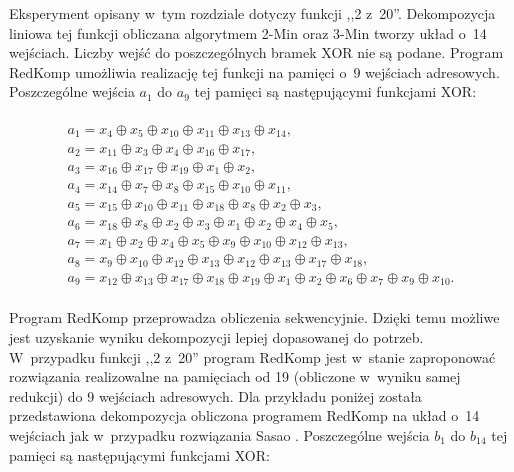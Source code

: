 Eksperyment opisany w~tym rozdziale dotyczy funkcji ,,2 z~20''.
Dekompozycja liniowa tej funkcji obliczana algorytmem 2-Min oraz 3-Min \cite{sasao-s-min} tworzy układ o~14 wejściach.
Liczby wejść do poszczególnych bramek XOR nie są podane.
Program RedKomp umożliwia realizację tej funkcji na pamięci o~9 wejściach adresowych.
Poszczególne wejścia $a_1$ do $a_9$ tej pamięci są następującymi funkcjami XOR:

\begin{multline} \\
a_1 = x_{4} \oplus x_{5} \oplus x_{10} \oplus x_{11} \oplus x_{13} \oplus x_{14}, \\
a_2 = x_{11} \oplus x_{3} \oplus x_{4} \oplus x_{16} \oplus x_{17}, \\
a_3 = x_{16} \oplus x_{17} \oplus x_{19} \oplus x_{1} \oplus x_{2}, \\
a_4 = x_{14} \oplus x_{7} \oplus x_{8} \oplus x_{15} \oplus x_{10} \oplus x_{11}, \\
a_5 = x_{15} \oplus x_{10} \oplus x_{11} \oplus x_{18} \oplus x_{8} \oplus x_{2} \oplus x_{3}, \\
a_6 = x_{18} \oplus x_{8} \oplus x_{2} \oplus x_{3} \oplus x_{1} \oplus x_{2} \oplus x_{4} \oplus x_{5}, \\
a_7 = x_{1} \oplus x_{2} \oplus x_{4} \oplus x_{5} \oplus x_{9} \oplus x_{10} \oplus x_{12} \oplus x_{13}, \\
a_8 = x_{9} \oplus x_{10} \oplus x_{12} \oplus x_{13} \oplus x_{12} \oplus x_{13} \oplus x_{17} \oplus x_{18}, \\
a_9 = x_{12} \oplus x_{13} \oplus x_{17} \oplus x_{18} \oplus x_{19} \oplus x_{1} \oplus x_{2} \oplus x_{6} \oplus x_{7} \oplus x_{9} \oplus x_{10}. \\
\end{multline}

Program RedKomp przeprowadza obliczenia sekwencyjnie.
Dzięki temu możliwe jest uzyskanie wyniku dekompozycji lepiej dopasowanej do potrzeb.
W~przypadku funkcji ,,2 z~20''
program RedKomp jest w~stanie zaproponować rozwiązania realizowalne na pamięciach
od 19 (obliczone w~wyniku samej redukcji) do 9 wejściach adresowych.
Dla przykładu poniżej została przedstawiona dekompozycja obliczona programem RedKomp na układ o~14 wejściach jak w~przypadku rozwiązania Sasao \cite{sasao-s-min}.
Poszczególne wejścia $b_1$ do $b_{14}$ tej pamięci są następującymi funkcjami XOR:

